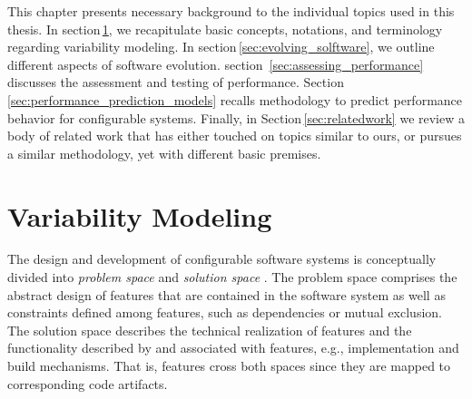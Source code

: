 This chapter presents necessary background to the individual topics used in this
thesis. In section\,\ref{sec:variability_modeling}, we recapitulate
basic concepts, notations, and terminology regarding variability modeling. In
section\,\ref{sec:evolving_solftware}, we outline different aspects of software evolution.
section~\ref{sec:assessing_performance} discusses the assessment and testing of
performance. Section\,\ref{sec:performance_prediction_models}
recalls methodology to predict performance behavior for configurable systems.
Finally, in Section\,\ref{sec:relatedwork} we review a body of related work that
has either touched on topics similar to ours, or pursues a similar methodology, yet
with different basic premises.

\section{Variability Modeling} \label{sec:variability_modeling}
The design and development of configurable software systems is conceptually
divided into \emph{problem space} and \emph{solution space} \citep{czarnecki_generative_2000}. The problem space
comprises the abstract design of features that are contained in the software
system as well as constraints defined among features, such as dependencies or mutual exclusion.
The solution space describes the technical realization of features and the
functionality described by and associated with features, e.g., implementation
and build mechanisms. That is, features cross both spaces since they are mapped
to corresponding code artifacts.

